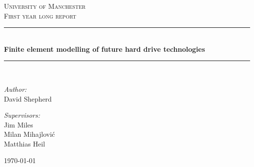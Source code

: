 \newcommand{\HRule}{\rule{\linewidth}{0.5mm}}

\begin{titlepage}

\begin{center}



\textsc{\LARGE University of Manchester}\\[1.5cm]

\textsc{\Large First year long report}\\[0.5cm]


\HRule \\[0.4cm]
{ \huge \bfseries Finite element modelling of future hard drive technologies}\\[0.4cm]

\HRule \\[1.5cm]

\begin{minipage}{0.4\textwidth}
  \begin{flushleft} \large
    \emph{Author:}\\
    David Shepherd
  \end{flushleft}
\end{minipage}
\begin{minipage}{0.4\textwidth}
  \begin{flushright} \large
    \emph{Supervisors:} \\
    Jim Miles\\
    Milan Mihajlovi\'{c}\\
    Matthias Heil
  \end{flushright}
\end{minipage}

\vfill

{\large \today}

\end{center}

\end{titlepage}


